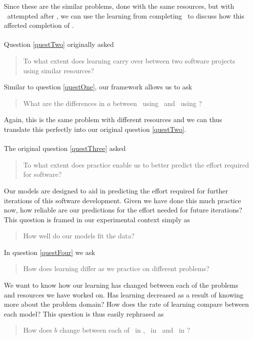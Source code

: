 Since these are the similar problems, done with the same resources, but with
\PO\ attempted after \PT, we can use the learning from completing \PO\ to
discuss how this affected completion of \PT.\\
\\
Question \ref{questTwo} originally asked
\begin{quote}
  To what extent does learning carry over between two software projects using
  similar resources?
\end{quote}

Similar to question \ref{questOne}, our framework allows us to ask
\begin{quote}
   What are the differences in $a$ between \PO\ using \LA\ and \PO\ using
  \LB?
\end{quote} \label{qq2}

Again, this is the same problem with different resources and we can thus
translate this perfectly into our original question \ref{questTwo}.\\
\\
The original question \ref{questThree} asked
\begin{quote}
  To what extent does practice enable us to better predict the effort required
  for software?
\end{quote}

Our models are designed to aid in predicting the effort required for further iterations of
this software development.
Given we have done this much practice now, how reliable are our predictions for
the effort needed for future iterations?
This question is framed in our experimental context simply as
\begin{quote}
  How well do our models fit the data?
\end{quote}\label{qq3}

In question \ref{questFour} we ask
\begin{quote}
  How does learning differ as we practice on different problems? 
\end{quote}

We want to know how our learning has changed between each of the problems and
resources we have worked on.
Has learning decreased as a result of knowing more about the problem domain?
How does the rate of learning compare between each model?
This question is thus easily rephrased as
\begin{quote}
   How does $b$ change between each of \PO\ in \LA, \PO\ in
   \LB\ and \PT\ in \LA?
\end{quote} \label{qq4}

